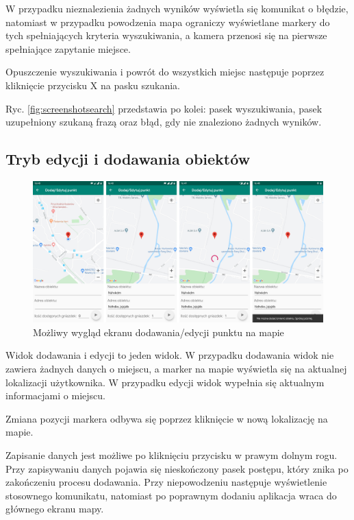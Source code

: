 \documentclass[polish,polish,a4paper,12pt]{article}
\begin{document}
	W przypadku nieznalezienia żadnych wyników wyświetla się komunikat o błędzie, natomiast w przypadku powodzenia mapa ograniczy wyświetlane markery do tych spełniających kryteria wyszukiwania, a kamera przenosi się na pierwsze spełniające zapytanie miejsce.

	Opuszczenie wyszukiwania i powrót do wszystkich miejsc następuje poprzez kliknięcie przycisku X na pasku szukania.

	Ryc. \ref{fig:screenshotsearch} przedstawia po kolei: pasek wyszukiwania, pasek uzupełniony szukaną frazą oraz błąd, gdy nie znaleziono żadnych wyników.

	\subsection{Tryb edycji i dodawania obiektów}

	\begin{figure}[H]
		\centering
		\includegraphics[width = \textwidth]{screenshot-addedit}
		\caption{Możliwy wygląd ekranu dodawania/edycji punktu na mapie}
		\label{fig:screenshotaddedit}
	\end{figure}

	Widok dodawania i edycji to jeden widok. W przypadku dodawania widok nie zawiera żadnych danych o miejscu, a marker na mapie wyświetla się na aktualnej lokalizacji użytkownika. W przypadku edycji widok wypełnia się aktualnym informacjami o miejscu.

	Zmiana pozycji markera odbywa się poprzez kliknięcie w nową lokalizację na mapie.

	Zapisanie danych jest możliwe po kliknięciu przycisku w prawym dolnym rogu. Przy zapisywaniu danych pojawia się nieskończony pasek postępu, który znika po zakończeniu procesu dodawania. Przy niepowodzeniu następuje wyświetlenie stosownego komunikatu, natomiast po poprawnym dodaniu aplikacja wraca do głównego ekranu mapy.
\end{document}
